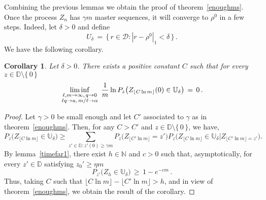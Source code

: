 \documentclass[a4paper,12pt]{article}
\newtheorem{corollary}[theorem]{Corollary}
\theoremstyle{definition}
\theoremstyle{remark}
\def \cD {\mathcal{D}}
\def \a {\alpha}
\def \g {\gamma}
\def \d {\delta}
\def \dD {\mathbb{D}}
\def \N {\mathbb{N}}
\def \dU {\mathbb{U}}
\def\lmq {{\genfrac{}{}{0pt}{1}{\ell,m\to\infty,\,q\to0}{\ell q\to a,\,m/\ell\to\a}}}
\begin{document}
Combining the previous lemmas 
we obtain the proof of theorem~\ref{enoughms}.
Once the process $Z_n$ has $\g m$ master sequences,
it will converge to $\rho^0$ in a few steps.
Indeed, let $\d>0$ and define
$$U_\d\,=\,\big\lbrace\,
r\in\cD:|r-\rho^0|_1<\d
\,\big\rbrace\,.$$
We have the following corollary.
\begin{corollary}\label{enterneigh}
Let $\d>0$.
There exists a positive constant $C$
such that for every $z\in\dD\setminus\lbrace\, 0\,\rbrace$
$$\liminf_\lmq\,
\frac{1}{m}\ln P_z\big(
Z_{\lfloor C\ln m\rfloor}(0)\in\dU_\d
\big)\,=\,0\,.$$
\end{corollary}
\begin{proof}
Let $\g>0$ be small enough and let $C'$ associated to $\g$ as in theorem~\ref{enoughms}.
Then, for any $C>C'$ and $z\in\dD\setminus\lbrace\,0\,\rbrace$,
we have,
$$
P_z\big(
Z_{\lfloor C\ln m\rfloor}\in\dU_\d
\big)\geq\!\!\!\!\!\!\sum_{z'\in\dD:z'(0)\geq \g m}\!\!\!\!\!\!P_z\big(
Z_{\lfloor C'\ln m\rfloor}=z'
\big)P_z\big(
Z_{\lfloor C\ln m\rfloor}\in\dU_\d\big|
Z_{\lfloor C' \ln m\rfloor=z'}
\big).
$$
By lemma~\ref{timefar1},
there exist $h\in\N$ and $c>0$ such that,
asymptotically, for every $z'\in\dD$ satisfying $z_0'\geq \eta m$
$$P_{z'}\big(
Z_h\in\dU_\d
\big)\,\geq\,1-e^{-c m}\,.$$
Thus, taking $C$ such that $\lfloor C\ln m\rfloor-\lfloor C'\ln m\rfloor>h$,
and in view of theorem~\ref{enoughms}, we obtain the result of the corollary.
\end{proof}
\end{document}

